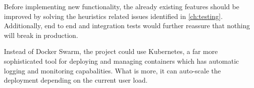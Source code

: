 Before implementing new functionality, the already existing features should be improved by solving the heuristics related issues identified in \autoref{ch:testing}. Additionally, end to end and integration tests would further reassure that nothing will break in production.

Instead of Docker Swarm, the project could use Kubernetes, a far more sophisticated tool for deploying and managing containers which has automatic logging and monitoring capabalities. What is more, it can auto-scale the deployment depending on the current user load.  

